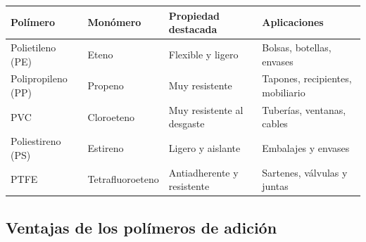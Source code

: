 \begin{center}

\renewcommand{\arraystretch}{1.3}

\begin{tabular}{p{2.6cm}p{2.9cm}p{3cm}p{4cm}}

\toprule

\textbf{Polímero} &
\textbf{Monómero} &
\textbf{Propiedad destacada} &
\textbf{Aplicaciones} \\

\midrule

Polietileno (PE)

& Eteno

& Flexible y ligero

& Bolsas, botellas, envases \\

\addlinespace

Polipropileno (PP)

& Propeno

& Muy resistente

& Tapones, recipientes, mobiliario \\

\addlinespace

PVC

& Cloroeteno

& Muy resistente al desgaste

& Tuberías, ventanas, cables \\

\addlinespace

Poliestireno (PS)

& Estireno

& Ligero y aislante

& Embalajes y envases \\

\addlinespace

PTFE

& Tetrafluoroeteno

& Antiadherente y resistente

& Sartenes, válvulas y juntas \\

\bottomrule

\end{tabular}

\end{center}


\subsection{Ventajas de los polímeros de adición}

